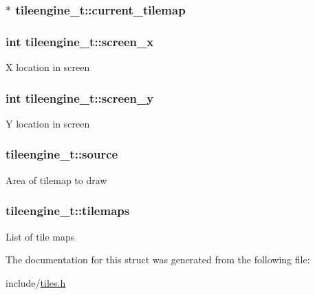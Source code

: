 \subsubsection[{\texorpdfstring{current\+\_\+tilemap}{current\_tilemap}}]{$\ast$ tileengine\+\_\+t\+::current\+\_\+tilemap}\hypertarget{structtileengine__t_a4ccb3297bc25e903bdd96dafed96dde0}{}\label{structtileengine__t_a4ccb3297bc25e903bdd96dafed96dde0}
\subsubsection[{\texorpdfstring{screen\+\_\+x}{screen\_x}}]{\setlength{\rightskip}{0pt plus 5cm}int tileengine\+\_\+t\+::screen\+\_\+x}\hypertarget{structtileengine__t_af49eaed92e5e773f88890a251de4e907}{}\label{structtileengine__t_af49eaed92e5e773f88890a251de4e907}
X location in screen 
\subsubsection[{\texorpdfstring{screen\+\_\+y}{screen\_y}}]{\setlength{\rightskip}{0pt plus 5cm}int tileengine\+\_\+t\+::screen\+\_\+y}\hypertarget{structtileengine__t_a0c0e11401653f0e4d6bcc5d6727b4a0c}{}\label{structtileengine__t_a0c0e11401653f0e4d6bcc5d6727b4a0c}
Y location in screen 
\subsubsection[{\texorpdfstring{source}{source}}]{ tileengine\+\_\+t\+::source}\hypertarget{structtileengine__t_ab8d030de148154d3ce462b94a8e4dc6f}{}\label{structtileengine__t_ab8d030de148154d3ce462b94a8e4dc6f}
Area of tilemap to draw 
\subsubsection[{\texorpdfstring{tilemaps}{tilemaps}}]{ tileengine\+\_\+t\+::tilemaps}\hypertarget{structtileengine__t_ab5bfc8e174c326d26fb236c238730c1f}{}\label{structtileengine__t_ab5bfc8e174c326d26fb236c238730c1f}
List of tile maps 

The documentation for this struct was generated from the following file\+:\begin{DoxyCompactItemize}
\item 
include/\hyperlink{tiles_8h}{tiles.\+h}\end{DoxyCompactItemize}
